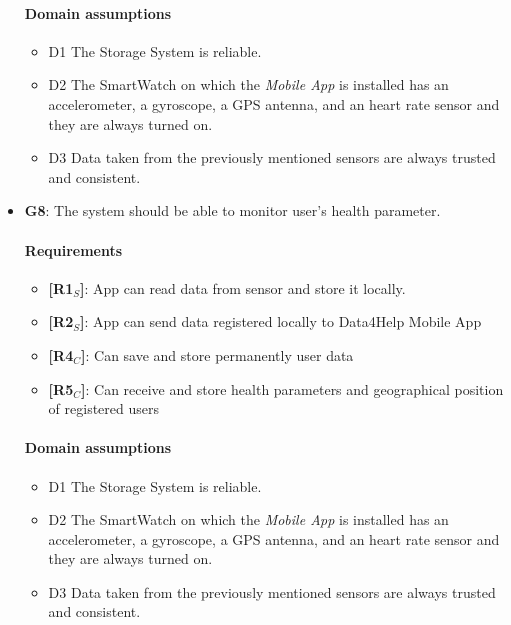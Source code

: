 \begin{itemize}
   \paragraph{Domain assumptions}
   \begin{itemize}
        \item  D1  The Storage System is reliable.
    
        \item  D2  The SmartWatch on which the \textit{Mobile App} is installed has an accelerometer, a gyroscope, a GPS antenna, and an heart rate sensor and they are always turned on.
    
        \item  D3  Data taken from the previously mentioned sensors are always trusted and consistent.
   \end{itemize}
   
    \item \textbf{G8}: The system should be able to monitor user's health parameter.
    \paragraph{Requirements}
   \begin{itemize}
       \item \textbf{[R1$_S$]}: App can read data from sensor and store it locally.
        \item \textbf{[R2$_S$]}: App can send data registered locally to Data4Help Mobile App
        \item \textbf{[R4$_C$]}: Can save and store permanently user data
    \item \textbf{[R5$_C$]}: Can receive and store health parameters and geographical position of registered users

   \end{itemize}
   \paragraph{Domain assumptions}
   \begin{itemize}
    \item  D1  The Storage System is reliable.
    
    \item  D2  The SmartWatch on which the \textit{Mobile App} is installed has an accelerometer, a gyroscope, a GPS antenna, and an heart rate sensor and they are always turned on.
    
    \item  D3  Data taken from the previously mentioned sensors are always trusted and consistent.
            

\end{itemize}
\end{itemize}
